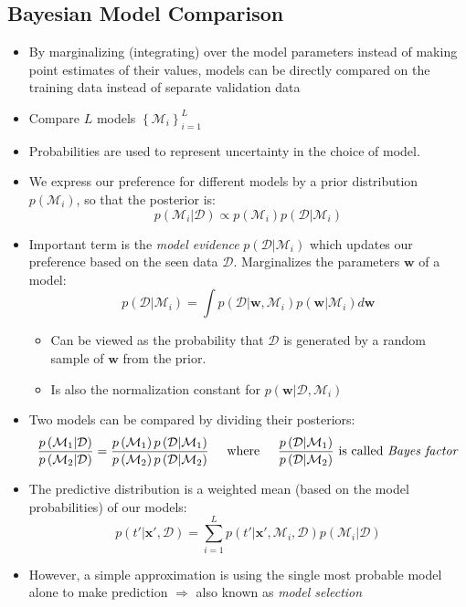 \subsection{Bayesian Model Comparison}
\begin{itemize}
	\item By marginalizing (integrating) over the model parameters instead of making point estimates of their values, models can be directly compared on the training data instead of separate validation data
	\item Compare $L$ models $\left\{\mathcal{M}_i\right\}_{i=1}^{L}$
	\item Probabilities are used to represent uncertainty in the choice of model. 
	\item We express our preference for different models by a prior distribution $p\left(\mathcal{M}_i\right)$, so that the posterior is:
	$$p\left(\mathcal{M}_i|\mathcal{D}\right)\propto p\left(\mathcal{M}_i\right)p\left(\mathcal{D}|\mathcal{M}_i\right)$$
	\item Important term is the \textit{model evidence} $p\left(\mathcal{D}|\mathcal{M}_i\right)$ which updates our preference based on the seen data $\mathcal{D}$. Marginalizes the parameters $\bm{w}$ of a model:
	$$p\left(\mathcal{D}|\mathcal{M}_i\right) = \int p\left(\mathcal{D}|\bm{w}, \mathcal{M}_i\right)p\left(\bm{w}|\mathcal{M}_i\right)d\bm{w}$$
	\begin{itemize}
		\item Can be viewed as the probability that $\mathcal{D}$ is generated by a random sample of $\bm{w}$ from the prior. 
		\item Is also the normalization constant for $p\left(\bm{w}|\mathcal{D}, \mathcal{M}_i\right)$
	\end{itemize}
	\item Two models can be compared by dividing their posteriors:
	$$\frac{p\left(\mathcal{M}_1|\mathcal{D}\right)}{p\left(\mathcal{M}_2|\mathcal{D}\right)} = \frac{p\left(\mathcal{M}_1\right)p\left(\mathcal{D}|\mathcal{M}_1\right)}{p\left(\mathcal{M}_2\right)p\left(\mathcal{D}|\mathcal{M}_2\right)} \text{\hspace{5mm}where\hspace{5mm}} \frac{p\left(\mathcal{D}|\mathcal{M}_1\right)}{p\left(\mathcal{D}|\mathcal{M}_2\right)}\text{ is called \textit{Bayes factor}}$$
	\item The predictive distribution is a weighted mean (based on the model probabilities) of our models:
	$$p\left(t'|\bm{x}',\mathcal{D}\right) = \sum\limits_{i=1}^{L}p\left(t'|\bm{x}', \mathcal{M}_i, \mathcal{D}\right) p\left(\mathcal{M}_i | \mathcal{D}\right)$$
	\item However, a simple approximation is using the single most probable model alone to make prediction $\Rightarrow$ also known as \textit{model selection}
\end{itemize}
